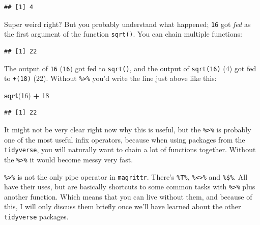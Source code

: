 \documentclass[]{gitbook}
\newenvironment{Shaded}{\begin{snugshade}}{\end{snugshade}}
\newcommand{\DataTypeTok}[1]{\textcolor[rgb]{0.13,0.29,0.53}{#1}}
\newcommand{\DecValTok}[1]{\textcolor[rgb]{0.00,0.00,0.81}{#1}}
\newcommand{\KeywordTok}[1]{\textcolor[rgb]{0.13,0.29,0.53}{\textbf{#1}}}
\newcommand{\NormalTok}[1]{#1}
\newcommand{\OperatorTok}[1]{\textcolor[rgb]{0.81,0.36,0.00}{\textbf{#1}}}
\newcommand{\StringTok}[1]{\textcolor[rgb]{0.31,0.60,0.02}{#1}}
\theoremstyle{definition}
\theoremstyle{definition}
\theoremstyle{definition}
\theoremstyle{remark}
\begin{document}
\begin{Shaded}
\end{Shaded}

\begin{verbatim}
## [1] 4
\end{verbatim}

Super weird right? But you probably understand what happened;
\texttt{16} got \emph{fed} as the first argument of the function
\texttt{sqrt()}. You can chain multiple functions:

\begin{Shaded}
\end{Shaded}

\begin{verbatim}
## [1] 22
\end{verbatim}

The output of \texttt{16} (\texttt{16}) got fed to \texttt{sqrt()}, and
the output of \texttt{sqrt(16)} (4) got fed to \texttt{+(18)} (22).
Without \texttt{\%\textgreater{}\%} you'd write the line just above like
this:

\begin{Shaded}
\begin{Highlighting}[]
\KeywordTok{sqrt}\NormalTok{(}\DecValTok{16}\NormalTok{) }\OperatorTok{+}\StringTok{ }\DecValTok{18}
\end{Highlighting}
\end{Shaded}

\begin{verbatim}
## [1] 22
\end{verbatim}

It might not be very clear right now why this is useful, but the
\texttt{\%\textgreater{}\%} is probably one of the most useful infix
operators, because when using packages from the \texttt{tidyverse}, you
will naturally want to chain a lot of functions together. Without the
\texttt{\%\textgreater{}\%} it would become messy very fast.

\texttt{\%\textgreater{}\%} is not the only pipe operator in
\texttt{magrittr}. There's \texttt{\%T\%},
\texttt{\%\textless{}\textgreater{}\%} and \texttt{\%\$\%}. All have
their uses, but are basically shortcuts to some common tasks with
\texttt{\%\textgreater{}\%} plus another function. Which means that you
can live without them, and because of this, I will only discuss them
briefly once we'll have learned about the other \texttt{tidyverse}
packages.
\end{document}
